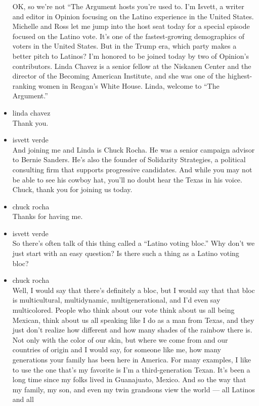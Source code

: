 \begin{itemize}
  OK, so we're not ``The Argument hosts you're used to. I'm Isvett, a
  writer and editor in Opinion focusing on the Latino experience in the
  United States. Michelle and Ross let me jump into the host seat today
  for a special episode focused on the Latino vote. It's one of the
  fastest-growing demographics of voters in the United States. But in
  the Trump era, which party makes a better pitch to Latinos? I'm
  honored to be joined today by two of Opinion's contributors. Linda
  Chavez is a senior fellow at the Niskanen Center and the director of
  the Becoming American Institute, and she was one of the
  highest-ranking women in Reagan's White House. Linda, welcome to ``The
  Argument.''
\item
  linda chavez\\
  Thank you.
\item
  isvett verde\\
  And joining me and Linda is Chuck Rocha. He was a senior campaign
  advisor to Bernie Sanders. He's also the founder of Solidarity
  Strategies, a political consulting firm that supports progressive
  candidates. And while you may not be able to see his cowboy hat,
  you'll no doubt hear the Texas in his voice. Chuck, thank you for
  joining us today.
\item
  chuck rocha\\
  Thanks for having me.
\item
  isvett verde\\
  So there's often talk of this thing called a ``Latino voting bloc.''
  Why don't we just start with an easy question? Is there such a thing
  as a Latino voting bloc?
\item
  chuck rocha\\
  Well, I would say that there's definitely a bloc, but I would say that
  that bloc is multicultural, multidynamic, multigenerational, and I'd
  even say multicolored. People who think about our vote think about us
  all being Mexican, think about us all speaking like I do as a man from
  Texas, and they just don't realize how different and how many shades
  of the rainbow there is. Not only with the color of our skin, but
  where we come from and our countries of origin and I would say, for
  someone like me, how many generations your family has been here in
  America. For many examples, I like to use the one that's my favorite
  is I'm a third-generation Texan. It's been a long time since my folks
  lived in Guanajuato, Mexico. And so the way that my family, my son,
  and even my twin grandsons view the world --- all Latinos and all

\end{itemize}

